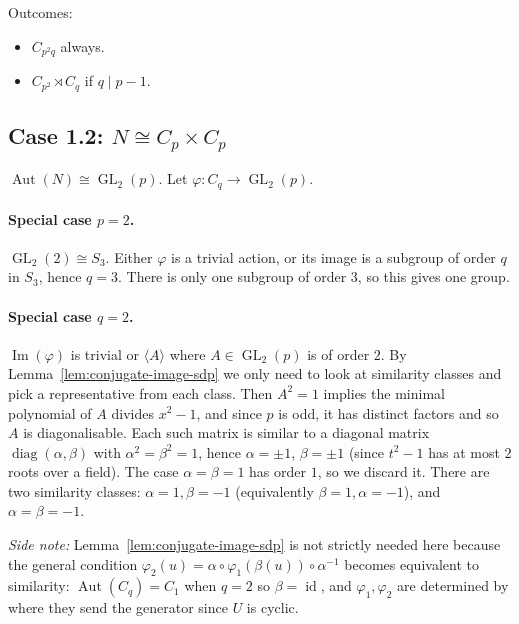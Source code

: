 Outcomes:
\begin{itemize}
    \item $C_{p^2 q}$ always.
    \item $C_{p^2} \rtimes C_q$ if $q \mid p - 1$.
\end{itemize}

\subsection{Case 1.2: $N \cong C_p \times C_p$}

$\operatorname{Aut}(N) \cong \operatorname{GL}_2(p)$. Let
$\varphi : C_q \to \operatorname{GL}_2(p)$.

\paragraph{Special case $p = 2$.}
$\operatorname{GL}_2(2) \cong S_3$. Either $\varphi$ is a trivial action, or
its image is a subgroup of order $q$ in $S_3$, hence $q = 3$. There is only
one subgroup of order $3$, so this gives one group.

\paragraph{Special case $q = 2$.}
$\operatorname{Im}(\varphi)$ is trivial or $\langle A \rangle$ where $A \in
\operatorname{GL}_2(p)$ is of order $2$. By Lemma~\ref{lem:conjugate-image-sdp}
we only need to look at similarity classes and pick a representative from
each class. Then $A^2 = 1$ implies the minimal polynomial of $A$ divides
$x^2 - 1$, and since $p$ is odd, it has distinct factors and so $A$ is
diagonalisable. Each such matrix is similar to a diagonal matrix
$\operatorname{diag}(\alpha, \beta)$ with $\alpha^2 = \beta^2 = 1$, hence
$\alpha = \pm 1$, $\beta = \pm 1$ (since $t^2 - 1$ has at most $2$ roots over a
field). The case $\alpha = \beta = 1$ has order $1$, so we discard it. There
are two similarity classes: $\alpha = 1, \beta = -1$ (equivalently
$\beta = 1, \alpha = -1$), and $\alpha = \beta = -1$.

\emph{Side note:} Lemma~\ref{lem:conjugate-image-sdp} is not strictly needed
here because the general condition $\varphi_2(u) = \alpha \circ
\varphi_1(\beta(u)) \circ \alpha^{-1}$ becomes equivalent to similarity:
$\operatorname{Aut}(C_q) = C_1$ when $q = 2$ so $\beta = \operatorname{id}$,
and $\varphi_1, \varphi_2$ are determined by where they send the generator
since $U$ is cyclic.

